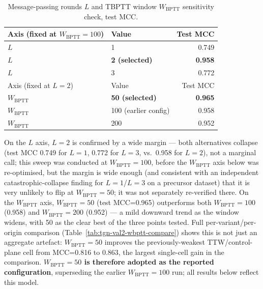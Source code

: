 \begin{table}[htbp]
\centering
\caption{Message-passing rounds $L$ and TBPTT window $W_{\text{BPTT}}$ sensitivity check, test MCC.}
\label{tab:tgn-val2-lwbptt-sweep}
\begin{tabular}{@{}llr@{}}
\toprule
Axis (fixed at $W_{\text{BPTT}}=100$) & Value & Test MCC \\
\midrule
$L$ & 1              & 0.749 \\
$L$ & \textbf{2 (selected)} & \textbf{0.958} \\
$L$ & 3              & 0.772 \\
\midrule
Axis (fixed at $L=2$) & Value & Test MCC \\
\midrule
$W_{\text{BPTT}}$ & \textbf{50 (selected)} & \textbf{0.965} \\
$W_{\text{BPTT}}$ & 100 (earlier config) & 0.958 \\
$W_{\text{BPTT}}$ & 200            & 0.952 \\
\bottomrule
\end{tabular}
\end{table}

On the $L$ axis, $L=2$ is confirmed by a wide margin — both alternatives
collapse (test MCC 0.749 for $L=1$, 0.772 for $L=3$, vs.\ 0.958 for
$L=2$), not a marginal call; this sweep was conducted at
$W_{\text{BPTT}}=100$, before the $W_{\text{BPTT}}$ axis below was
re-optimised, but the margin is wide enough (and consistent with an
independent catastrophic-collapse finding for $L=1$/$L=3$ on a precursor
dataset) that it is very unlikely to flip at $W_{\text{BPTT}}=50$; it was
not separately re-verified there. On the $W_{\text{BPTT}}$ axis,
$W_{\text{BPTT}}=50$ (test MCC=0.965) outperforms both $W_{\text{BPTT}}=100$
(0.958) and $W_{\text{BPTT}}=200$ (0.952) — a mild downward trend as the
window widens, with 50 as the clear best of the three points tested. Full
per-variant/per-origin comparison (Table~\ref{tab:tgn-val2-wbptt-compare})
shows this is not just an aggregate artefact: $W_{\text{BPTT}}=50$
improves the previously-weakest TTW/control-plane cell from MCC=0.816 to
0.863, the largest single-cell gain in the comparison.
\textbf{$W_{\text{BPTT}}=50$ is therefore adopted as the reported
configuration}, superseding the earlier $W_{\text{BPTT}}=100$ run; all
results below reflect this model.

